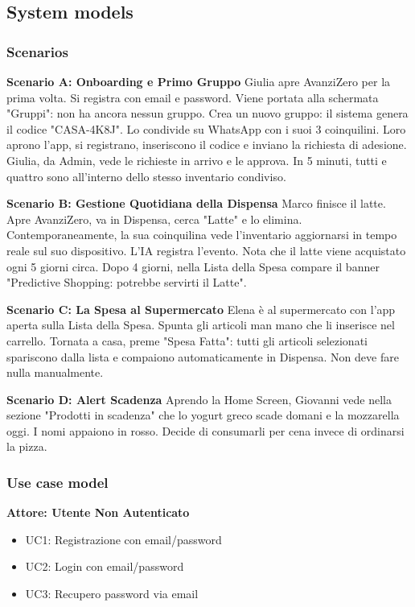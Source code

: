 \documentclass[12pt,a4paper]{article}
\begin{document}
\subsection{System models}

\subsubsection{Scenarios}

\textbf{Scenario A: Onboarding e Primo Gruppo}
Giulia apre AvanziZero per la prima volta. Si registra con email e password. Viene portata alla schermata "Gruppi": non ha ancora nessun gruppo. Crea un nuovo gruppo: il sistema genera il codice "CASA-4K8J". Lo condivide su WhatsApp con i suoi 3 coinquilini. Loro aprono l'app, si registrano, inseriscono il codice e inviano la richiesta di adesione. Giulia, da Admin, vede le richieste in arrivo e le approva. In 5 minuti, tutti e quattro sono all'interno dello stesso inventario condiviso.

\textbf{Scenario B: Gestione Quotidiana della Dispensa}
Marco finisce il latte. Apre AvanziZero, va in Dispensa, cerca "Latte" e lo elimina. Contemporaneamente, la sua coinquilina vede l'inventario aggiornarsi in tempo reale sul suo dispositivo. L'IA registra l'evento. Nota che il latte viene acquistato ogni 5 giorni circa. Dopo 4 giorni, nella Lista della Spesa compare il banner "Predictive Shopping: potrebbe servirti il Latte".

\textbf{Scenario C: La Spesa al Supermercato}
Elena è al supermercato con l'app aperta sulla Lista della Spesa. Spunta gli articoli man mano che li inserisce nel carrello. Tornata a casa, preme "Spesa Fatta": tutti gli articoli selezionati spariscono dalla lista e compaiono automaticamente in Dispensa. Non deve fare nulla manualmente.

\textbf{Scenario D: Alert Scadenza}
Aprendo la Home Screen, Giovanni vede nella sezione "Prodotti in scadenza" che lo yogurt greco scade domani e la mozzarella oggi. I nomi appaiono in rosso. Decide di consumarli per cena invece di ordinarsi la pizza.

\subsubsection{Use case model}

\textbf{Attore: Utente Non Autenticato}
\begin{itemize}
    \item UC1: Registrazione con email/password
    \item UC2: Login con email/password
    \item UC3: Recupero password via email
\end{itemize}
\end{document}
